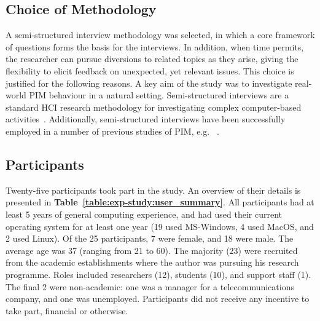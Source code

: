 \subsection{Choice of Methodology}
\label{exp-study:method-choice}
A semi-structured interview methodology was selected, in which a core framework of questions forms the basis for the interviews. In addition, when time permits, the researcher can pursue diversions to related topics as they arise, giving the flexibility to elicit feedback on unexpected, yet relevant issues. This choice is justified for the following reasons. A key aim of the study was to investigate real-world PIM behaviour in a natural setting.  Semi-structured interviews are a standard HCI research methodology for investigating complex computer-based activities~\citep{Robson:01}.  Additionally, semi-structured interviews have been successfully employed in a number of previous studies of PIM, e.g. ~\citep{Whittaker-email:96}.  


\subsection{Participants}
\label{exp-study:user-selection}
Twenty-five participants took part in the study.  An overview of their details is presented in \textbf{Table~\ref{table:exp-study:user_summary}}.  All participants had at least 5 years of general computing experience, and had used their current operating system for at least one year (19 used MS-Windows, 4 used MacOS, and 2 used Linux).  Of the 25 participants, 7 were female, and 18 were male.  The average age was 37 (ranging from 21 to 60).  The majority (23) were recruited from the academic establishments where the author was pursuing his research programme.
Roles included researchers (12), students (10), and support staff (1). The final 2 were non-academic: one was a manager for a telecommunications company, and one was unemployed. Participants did not receive any incentive to take part, financial or otherwise. 

